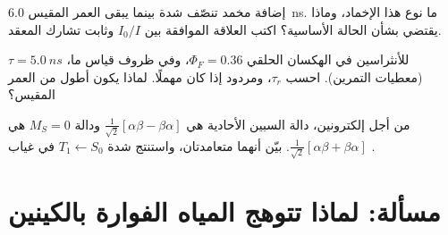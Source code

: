 \begin{exercise}[$\star\star\star$]\label{exo:b3:electronic-spectroscopy:10}
إضافة مخمد تنصّف شدة  بينما يبقى العمر المقيس
\qty{6.0}{ns}. ما نوع هذا الإخماد، وماذا يقتضي بشأن
الحالة الأساسية؟ اكتب العلاقة الموافقة بين $I_0/I$
وثابت تشارك المعقد.
\end{exercise}

\begin{exercise}[$\star\star\star$]\label{exo:b3:electronic-spectroscopy:11}
للأنثراسين في الهكسان الحلقي $\Phi_F = 0.36$، وفي ظروف
قياس ما، $\tau = \qty{5.0}{ns}$ (معطيات التمرين). احسب $\tau_r$، 
ومردود  إذا كان  مهملًا. لماذا يكون
 أطول من العمر المقيس؟
\end{exercise}

\begin{exercise}[$\star\star\star$]\label{exo:b3:electronic-spectroscopy:12}
من أجل إلكترونين، دالة السبين الأحادية هي $\frac{1}{\sqrt2}[\alpha\beta - \beta\alpha]$
ودالة  $M_S = 0$ هي $\frac{1}{\sqrt2}[\alpha\beta + \beta\alpha]$. بيّن أنهما
متعامدتان، واستنتج شدة $T_1 \leftarrow S_0$ في
غياب .
\end{exercise}

\section{مسألة: لماذا تتوهج المياه الفوارة بالكينين}

